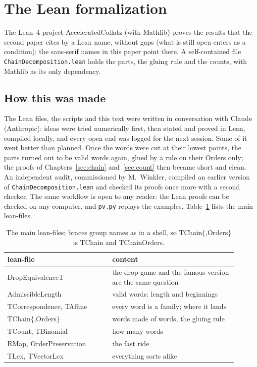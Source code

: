 \documentclass[10pt,a4paper,titlepage]{article}
\newcommand{\lean}[1]{\textsf{#1}}
\begin{document}
\section{The Lean formalization}
\label{app:lean}

The Lean~4 project \lean{AcceleratedCollatz} (with Mathlib) proves the results that the
second paper cites by a Lean name, without gaps (what is still open enters as a condition); the sans-serif names in this paper point there. A
self-contained file \texttt{ChainDecomposition.lean} holds the parts, the gluing rule
and the counts, with Mathlib as its only dependency.

\subsection*{How this was made}

The Lean files, the scripts and this text were written in conversation with
Claude (Anthropic): ideas were tried numerically first, then stated and proved in
Lean, compiled locally, and every open end was logged for the next session. Some
of it went better than planned. Once the words were cut at their lowest points, the
parts turned out to be valid words again, glued by a rule on their Orders only; the
proofs of Chapters~\ref{sec:chain} and~\ref{sec:count} then became short and clean. An
independent audit, commissioned by M.~Winkler, compiled an earlier version of
\texttt{ChainDecomposition.lean} and checked its proofs once more with a second checker. The
same workflow is open to any reader: the Lean proofs can be checked on any computer,
and \texttt{pv.py} replays the examples. Table~\ref{tab:lean} lists the main lean-files.

\begin{table}[htbp]
\centering
\begin{tabular}{@{}>{\raggedright\arraybackslash}p{0.42\linewidth}>{\raggedright\arraybackslash}p{0.5\linewidth}@{}}
\toprule
lean-file & content \\
\midrule
\lean{DropEquivalenceT} & the drop game and the famous version are the same question \\
\lean{AdmissibleLength} & valid words: length and beginnings \\
\lean{TCorrespondence}, \lean{TAffine} & every word is a family; where it lands \\
\lean{TChain$\{$,Orders$\}$} & words made of words, the gluing rule \\
\lean{TCount}, \lean{TBinomial} & how many words \\
\lean{RMap}, \lean{OrderPreservation} & the fast ride \\
\lean{TLex}, \lean{TVectorLex} & everything sorts alike \\
\bottomrule
\end{tabular}
\caption{The main lean-files; braces group names as in a shell, so \lean{TChain$\{$,Orders$\}$} is \lean{TChain} and \lean{TChainOrders}.}
\label{tab:lean}
\end{table}
\end{document}
